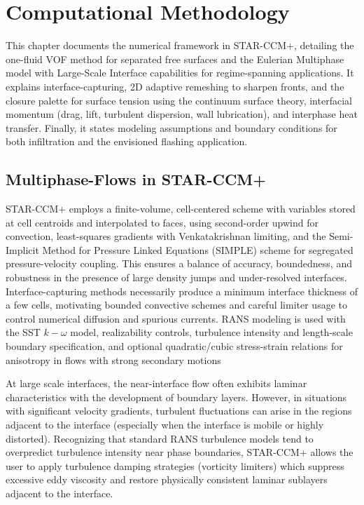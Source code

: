 \section{Computational Methodology}\label{chap2}
This chapter documents the numerical framework in STAR-CCM+, 
detailing the one-fluid VOF method for separated free surfaces and 
the Eulerian Multiphase model with Large-Scale Interface capabilities 
for regime-spanning applications. It explains interface-capturing, 2D adaptive remeshing to sharpen fronts, 
and the closure palette for surface tension using the continuum surface theory, 
interfacial momentum (drag, lift, turbulent dispersion, wall lubrication), 
and interphase heat transfer. Finally, it states modeling assumptions and boundary conditions for both 
infiltration and the envisioned flashing application.
\subsection{Multiphase-Flows in STAR-CCM+}
STAR-CCM+ employs a finite-volume, cell-centered scheme with 
 variables stored at cell centroids and interpolated to faces, 
 using second-order upwind for convection, least-squares gradients 
 with Venkatakrishnan limiting, and the Semi-Implicit Method for Pressure Linked Equations 
 (SIMPLE) scheme for segregated pressure-velocity coupling. This ensures a balance of accuracy, boundedness, and 
 robustness in the presence of large density jumps and under-resolved interfaces. 
 Interface-capturing methods necessarily produce a minimum interface thickness of a few cells, motivating bounded convective schemes 
 and careful limiter usage to control numerical diffusion and spurious currents. RANS modeling is used with the SST $k-\omega$ model, realizability controls, turbulence intensity and length-scale boundary specification, and optional quadratic/cubic 
stress-strain relations for anisotropy in flows with strong secondary motions

At large scale interfaces, the near-interface flow often exhibits
 laminar characteristics with the development of boundary layers. However, in situations
 with significant velocity gradients, turbulent fluctuations can arise in the
 regions adjacent to the interface (especially when the interface is mobile or
 highly distorted). Recognizing that standard RANS turbulence
 models tend to overpredict turbulence intensity near phase boundaries,
 STAR-CCM+ allows the user to apply turbulence damping strategies
 (vorticity limiters) which suppress excessive eddy viscosity and
 restore physically consistent laminar sublayers adjacent to the interface.

